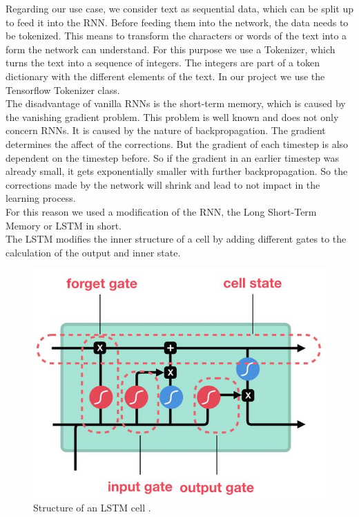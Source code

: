 \documentclass[conference]{IEEEtran}
\begin{document}
Regarding our use case, we consider text as sequential data, which can be split up to feed it into the RNN. Before feeding them into the network, the data needs to be tokenized. This means to transform the characters or words of the text into a form the network can understand. For this purpose we use a Tokenizer, which turns the text into a sequence of integers. The integers are part of a token dictionary with the different elements of the text. In our project we use the Tensorflow Tokenizer class.\\
The disadvantage of vanilla RNNs is the short-term memory, which is caused by the vanishing gradient problem. This problem is well known and does not only concern RNNs. It is caused by the nature of backpropagation. The gradient determines the affect of the corrections. But the gradient of each timestep is also dependent on the timestep before. So if the gradient in an earlier timestep was already small, it gets exponentially smaller with further backpropagation. So the corrections made by the network will shrink and lead to not impact in the learning process.\\
For this reason we used a modification of the RNN, the Long Short-Term Memory or LSTM in short.\\
The LSTM modifies the inner structure of a cell by adding different gates to the calculation of the output and inner state.

\begin{figure}[htbp]
\centerline{\includegraphics[scale=0.5]{pictures/structure_lstm.png}}
\caption{Structure of an LSTM cell \cite{tim3}.}
\label{fig:structure_lstm}
\end{figure}
\end{document}
